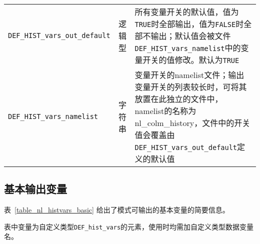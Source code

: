 {\begin{longtable}[htbp]{lcp{}}
\texttt{DEF\_HIST\_vars\_out\_default} & 逻辑型 & 所有变量开关的默认值，值为\texttt{TRUE}时全部输出，值为\texttt{FALSE}时全部不输出；默认值会被文件\texttt{DEF\_HIST\_vars\_namelist}中的变量开关的值修改。默认为\texttt{TRUE} \\
\texttt{DEF\_HIST\_vars\_namelist} & 字符串 & 变量开关的namelist文件；输出变量开关的列表较长时，可将其放置在此独立的文件中，namelist的名称为nl\_colm\_history，文件中的开关值会覆盖由\texttt{DEF\_HIST\_vars\_out\_default}定义的默认值 \\
\end{longtable}}
\clearpage

\subsection{基本输出变量} \label{sec_hist_vars_basic}

表~\ref{table_nl_histvars_basic} 给出了模式可输出的基本变量的简要信息。\par
表中变量为自定义类型\texttt{DEF\_hist\_vars}的元素，使用时均需加自定义类型数据变量名。

